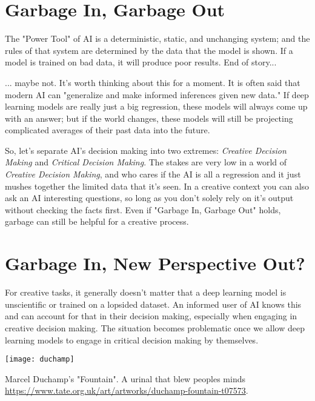 \section{Garbage In, Garbage Out}

The "Power Tool" of AI is a deterministic, static, and unchanging system; and the rules of that system are determined by the data that the model is shown. If a model is trained on bad data, it will produce poor results. End of story...

... maybe not. It’s worth thinking about this for a moment. It is often said that modern AI can "generalize and make informed inferences given new data." If deep learning models are really just a big regression, these models will always come up with an answer; but if the world changes, these models will still be projecting complicated averages of their past data into the future.

So, let’s separate AI’s decision making into two extremes: \textit{Creative Decision Making} and \textit{Critical Decision Making}. The stakes are very low in a world of \textit{Creative Decision Making}, and who cares if the AI is all a regression and it just mushes together the limited data that it's seen. In a creative context you can also ask an AI interesting questions, so long as you don't solely rely on it's output without checking the facts first. Even if "Garbage In, Garbage Out" holds, garbage can still be helpful for a creative process. 

\section{Garbage In, New Perspective Out?}

For creative tasks, it generally doesn’t matter that a deep learning model is unscientific or trained on a lopsided dataset. An informed user of AI knows this and can account for that in their decision making, especially when engaging in creative decision making. The situation becomes problematic once we allow deep learning models to engage in critical decision making by themselves.

\begin{pdf}
\begin{marginfigure}[-5.5cm]
        \texttt{[image: duchamp]}
        \caption{Marcel Duchamp's "Fountain". A urinal that blew peoples minds \url{https://www.tate.org.uk/art/artworks/duchamp-fountain-t07573}.}
\end{marginfigure}
\end{pdf}


